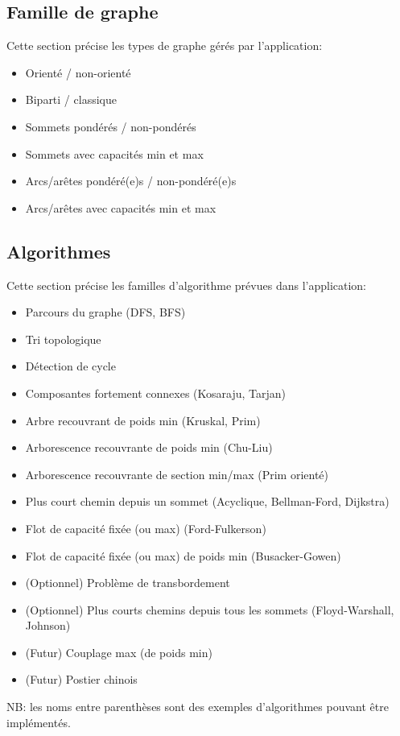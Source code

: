 \documentclass[french]{article}
\begin{document}
		\subsection{Famille de graphe}
			Cette section précise les types de graphe gérés par l'application:
			\begin{itemize}
				\item Orienté / non-orienté
				\item Biparti / classique
				\item Sommets pondérés / non-pondérés
				\item Sommets avec capacités min et max
				\item Arcs/arêtes pondéré(e)s / non-pondéré(e)s
				\item Arcs/arêtes avec capacités min et max
			\end{itemize}
			
		\subsection{Algorithmes}
			Cette section précise les familles d'algorithme prévues dans l'application:
			\begin{itemize}
				\item Parcours du graphe (DFS, BFS)
				\item Tri topologique
				\item Détection de cycle
				\item Composantes fortement connexes (Kosaraju, Tarjan) 
				\item Arbre recouvrant de poids min (Kruskal, Prim)
				\item Arborescence recouvrante de poids min (Chu-Liu)
				\item Arborescence recouvrante de section min/max (Prim orienté)
				\item Plus court chemin depuis un sommet (Acyclique, Bellman-Ford, Dijkstra)
				\item Flot de capacité fixée (ou max) (Ford-Fulkerson)
				\item Flot de capacité fixée (ou max) de poids min (Busacker-Gowen)
				\item (Optionnel) Problème de transbordement
				\item (Optionnel) Plus courts chemins depuis tous les sommets (Floyd-Warshall, Johnson)
				\item (Futur) Couplage max (de poids min)
				\item (Futur) Postier chinois
			\end{itemize}
			NB: les noms entre parenthèses sont des exemples d'algorithmes pouvant être implémentés.\newline
			
\end{document}
